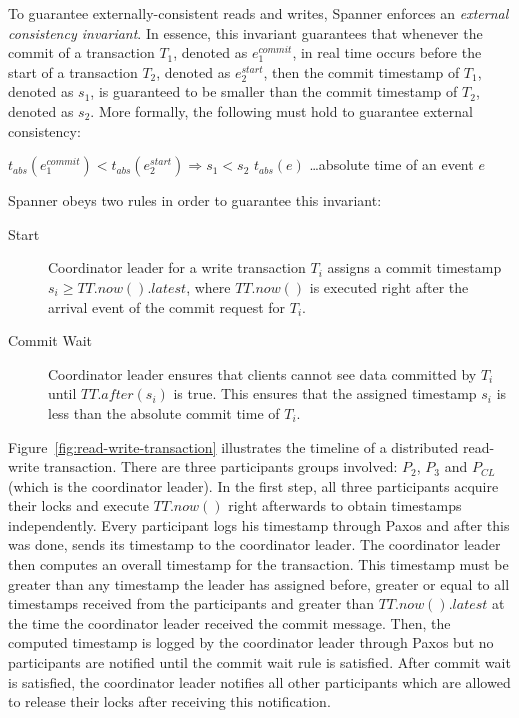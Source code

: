 \documentclass[onecolumn, a4paper, 10pt]{article}
\begin{document}
To guarantee externally-consistent reads and writes, Spanner enforces an
\emph{external consistency invariant}. In essence, this invariant guarantees that
whenever the commit of a transaction $T_1$, denoted as $e_1^{commit}$, in real
time occurs before the start of a transaction $T_2$, denoted as $e_2^{start}$,
then the commit timestamp of $T_1$, denoted as $s_1$, is guaranteed to be smaller
than the commit timestamp of $T_2$, denoted as $s_2$. More formally, the following
must hold to guarantee external consistency:
\begin{center}
$t_{abs}\left(e_1^{commit}\right) < t_{abs}\left(e_2^{start}\right) \Rightarrow s_1 < s_2$
\qquad\qquad $t_{abs}(e)$ \ldots absolute time of an event $e$
\end{center}

\noindent
Spanner obeys two rules in order to guarantee this invariant:
\begin{description}
  \item[Start] Coordinator leader for a write transaction $T_i$ assigns a commit
    timestamp $s_i \geq TT.now().latest$, where $TT.now()$ is executed right after
    the arrival event of the commit request for $T_i$.
  \item[Commit Wait] Coordinator leader ensures that clients cannot see data
    committed by $T_i$ until $TT.after\left(s_i\right)$ is true. This ensures
    that the assigned timestamp $s_i$ is less than the absolute commit time of
    $T_i$.~\cite{Corbett:2012}
\end{description}

Figure~\ref{fig:read-write-transaction} illustrates the timeline of a distributed
read-write transaction. There are three participants groups involved: $P_2$, $P_3$
and $P_{CL}$ (which is the coordinator leader). In the first step, all three
participants acquire their locks and execute $TT.now()$ right afterwards to obtain
timestamps independently. Every participant logs his timestamp through Paxos and
after this was done, sends its timestamp to the coordinator leader. The
coordinator leader then computes an overall timestamp for the transaction. This
timestamp must be greater than any timestamp the leader has assigned before,
greater or equal to all timestamps received from the participants and greater than
$TT.now().latest$ at the time the coordinator leader received the commit message.
Then, the computed timestamp is logged by the coordinator leader through Paxos
but no participants are notified until the commit wait rule is satisfied. After
commit wait is satisfied, the coordinator leader notifies all other participants
which are allowed to release their locks after receiving this notification.
\end{document}
